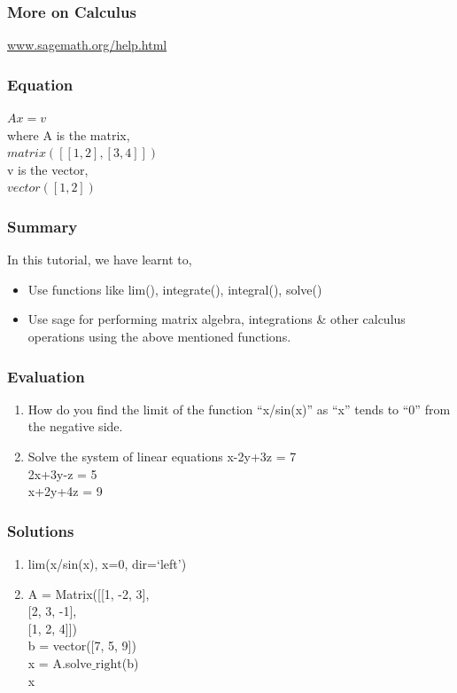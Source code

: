 \documentclass[17pt]{beamer}
\begin{document}
\begin{frame}
\frametitle{More on Calculus}
\url{www.sagemath.org/help.html}
\end{frame}
\begin{frame}
\frametitle{Equation}
  $Ax = v$\\
  where A is the matrix,\\ 
  $matrix([[1,2],[3,4]])$\\
  v is the vector,\\
  $vector([1,2])$
\end{frame}
\begin{frame}
\frametitle{Summary}
In this tutorial, we have learnt to,  
\begin{itemize}
\item Use functions like lim(), integrate(), integral(), solve()
\item Use sage for performing matrix algebra, integrations \& other calculus
operations using the above mentioned functions.
\end{itemize}
\end{frame}
\begin{frame}
\frametitle{Evaluation}
\begin{enumerate}
\item How do you find the limit of the function ``x/sin(x)'' as ``x'' tends 
    to ``0'' from the negative side.
\vspace{3pt}
\vspace{3pt}
\item Solve the system of linear equations
    x-2y+3z = 7\\
    2x+3y-z = 5\\
    x+2y+4z = 9
\end{enumerate}
\end{frame}
\begin{frame}
\frametitle{Solutions}
\begin{enumerate}
\item lim(x/sin(x), x=0, dir=`left')
\vspace{4pt}
\item A = Matrix([[1, -2, 3], \\
\hspace{1.78cm}
                  [2, 3, -1], \\
\hspace{1.78cm}             
                  [1, 2, 4]]) \\
\vspace{2pt}
   b = vector([7, 5, 9])\\
\vspace{2pt}
   x = A.solve$\_{\mathrm{right}}$(b)\\
\vspace{2pt}
   x   
\end{enumerate}
\end{frame}
\end{document}
